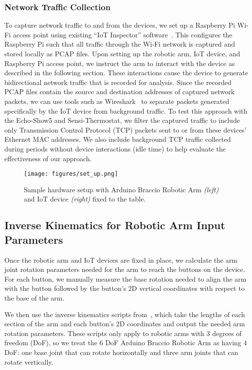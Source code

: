 \subsubsection{Network Traffic Collection} 
\label{sec:network-collection}
To capture network traffic to and from the devices, we set up a Raspberry Pi Wi-Fi access point using existing ``IoT Inspector'' software~\cite{iot_inspector}. This configures the Raspberry Pi such that all traffic through the Wi-Fi network is captured and stored locally as PCAP files. Upon setting up the robotic arm, IoT device, and Raspberry Pi access point, we instruct the arm to interact with the device as described in the following section. These interactions cause the device to generate bidirectional network traffic that is recorded for analysis.
Since the recorded PCAP files contain the source and destination addresses of captured network packets, we can use tools such as Wireshark~\cite{wireshark} to separate packets generated specifically by the IoT device from background traffic.
To test this approach with the Echo-Show5 and Sensi-Thermostat, we filter the captured traffic to include only 
Transmission Control Protocol (TCP) packets sent to or from these devices' Ethernet MAC addresses. We also include background TCP traffic collected during periods without device interactions (idle time) to help evaluate the effectiveness of our approach.

\begin{figure}
    \centering
    \texttt{[image: figures/set\_up.png]}
    \caption{Sample hardware setup with Arduino Braccio Robotic Arm \textit{(left)} and IoT device \textit{(right)} fixed to the table.}
    \label{fig:set_up}
\end{figure}

\subsection{Inverse Kinematics for Robotic Arm Input Parameters}
\label{sec:inverse-kinematics}
Once the robotic arm and IoT devices are fixed in place, we calculate the arm joint rotation parameters needed for the arm to reach the buttons on the device. 
For each button, we manually measure the base rotation needed to align the arm with the button followed by the button's 2D vertical coordinates with respect to the base of the arm. 

We then use the inverse kinematics scripts from~\cite{invkin}, which take the lengths of each section of the arm and each button's 2D coordinates and output the needed arm rotation parameters. 
These scripts only apply to robotic arms with 3 degrees of freedom (DoF), so we treat the 6 DoF Arduino Braccio Robotic Arm
as having 4 DoF: one base joint that can rotate horizontally and three arm joints that can rotate vertically.

